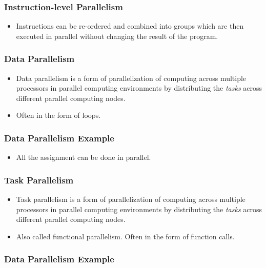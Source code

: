 \documentclass{beamer}
\begin{document}
\begin{CJK}{UTF8}{bsmi}
  \begin{frame}
    \frametitle{Instruction-level Parallelism} 
    \begin{itemize}
    \item Instructions can be re-ordered and combined into groups which
      are then executed in parallel without changing the result of the
      program.
    \end{itemize}
  \end{frame}

  \begin{frame}
    \frametitle{Data Parallelism}
    \begin{itemize}
    \item Data parallelism is a form of parallelization of computing
      across multiple processors in parallel computing environments by
      distributing the {\em tasks} across different parallel computing
      nodes.
    \item Often in the form of loops.
    \end{itemize}
  \end{frame}

  \begin{frame}
    \frametitle{Data Parallelism Example}
    \begin{itemize}
    \item All the assignment can be done in parallel.
    \end{itemize}
  \end{frame}

  \begin{frame}
    \frametitle{Task Parallelism} 
    \begin{itemize}
    \item Task parallelism is a form of parallelization of computing
      across multiple processors in parallel computing environments by
      distributing the {\em tasks} across different parallel computing
      nodes.
    \item Also called functional parallelism.  Often in the form of
      function calls.
    \end{itemize}
  \end{frame}

  \begin{frame}
    \frametitle{Data Parallelism Example}
  \end{frame}



\end{CJK}
\end{document}
